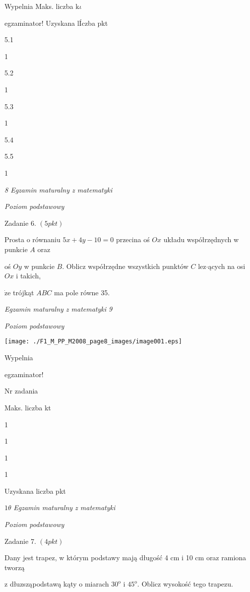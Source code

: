\documentclass[a4paper,12pt]{article}
\begin{document}
Wypelnia Maks. liczba $\mathrm{k}\iota$

egzaminator! Uzyskana lÍczba pkt

5.1

1

5.2

1

5.3

1

5.4

5.5

1





{\it 8 Egzamin maturalny z matematyki}

{\it Poziom podstawowy}

Zadanie 6. $(5pkt)$

Prosta o równaniu $5x+4y-10=0$ przecina oś $Ox$ układu współrzędnych w punkcie $A$ oraz

oś $Oy$ w punkcie $B$. Oblicz współrzędne wszystkich punktów $C$ lez$\cdot$ących na osi $Ox$ i takich,

$\dot{\mathrm{z}}\mathrm{e}$ trójkąt $ABC$ ma pole równe 35.





{\it Egzamin maturalny z matematyki 9}

{\it Poziom podstawowy}
\begin{center}
\texttt{[image: ./F1\_M\_PP\_M2008\_page8\_images/image001.eps]}
\end{center}
Wypelnia

egzaminator!

Nr zadania

Maks. liczba kt

1

1

1

1

Uzyskana liczba pkt





$ 1\theta$ {\it Egzamin maturalny z matematyki}

{\it Poziom podstawowy}

Zadanie 7. $(4pkt)$

Dany jest trapez, w którym podstawy mają długość 4 cm i 10 cm oraz ramiona tworzą

z dłuzsząpodstawą kąty o miarach $30^{\mathrm{o}}$ i $45^{\mathrm{o}}$. Oblicz wysokość tego trapezu.
\end{document}
